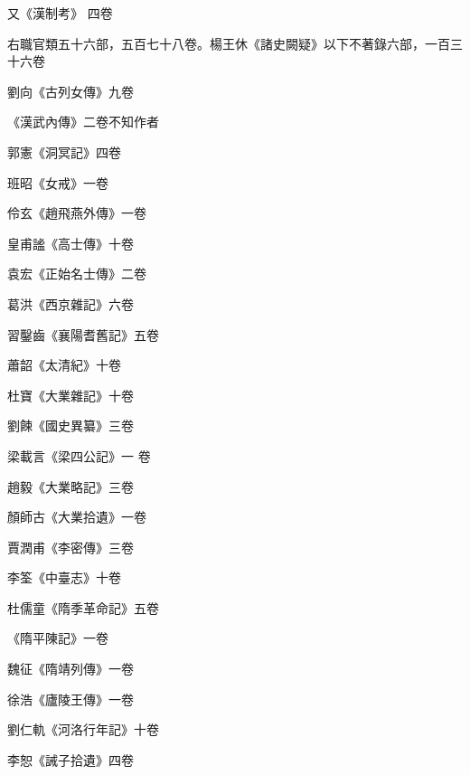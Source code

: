 \begin{pinyinscope}
 又《漢制考》
 四卷



 右職官類五十六部，五百七十八卷。楊王休《諸史闕疑》以下不著錄六部，一百三十六卷



 劉向《古列女傳》九卷



 《漢武內傳》二卷不知作者



 郭憲《洞冥記》四卷



 班昭《女戒》一卷



 伶玄《趙飛燕外傳》一卷



 皇甫謐《高士傳》十卷



 袁宏《正始名士傳》二卷



 葛洪《西京雜記》六卷



 習鑿齒《襄陽耆舊記》五卷



 蕭韶《太清紀》十卷



 杜寶《大業雜記》十卷



 劉餗《國史異纂》三卷



 梁載言《梁四公記》一
 卷



 趙毅《大業略記》三卷



 顏師古《大業拾遺》一卷



 賈潤甫《李密傳》三卷



 李筌《中臺志》十卷



 杜儒童《隋季革命記》五卷



 《隋平陳記》一卷



 魏征《隋靖列傳》一卷



 徐浩《廬陵王傳》一卷



 劉仁軌《河洛行年記》十卷



 李恕《誡子拾遺》四卷




\end{pinyinscope}

